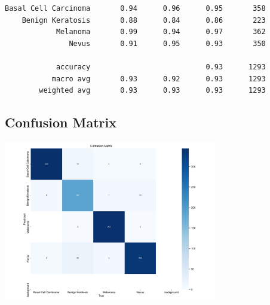 \documentclass[a4paper,12pt]{report}
\begin{document}
\begin{spacing}{1.5}
\begin{verbatim}
Basal Cell Carcinoma       0.94      0.96      0.95       358
    Benign Keratosis       0.88      0.84      0.86       223
            Melanoma       0.99      0.94      0.97       362
               Nevus       0.91      0.95      0.93       350

            accuracy                           0.93      1293
           macro avg       0.93      0.92      0.93      1293
        weighted avg       0.93      0.93      0.93      1293
    \end{verbatim}

    \subsection*{Confusion Matrix}
    \begin{center}
        \includegraphics[width=0.7\textwidth]{Pics/confusion_matrix.png}
    \end{center}


\end{spacing}
\end{document}

